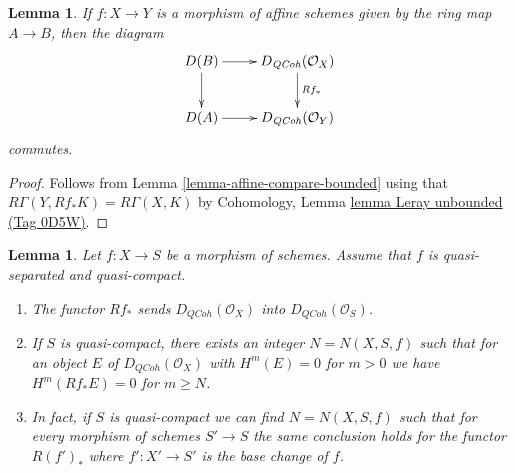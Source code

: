 \documentclass{amsart}
\theoremstyle{plain}
\newtheorem{lemma}[subsection]{Lemma}
\theoremstyle{definition}
\theoremstyle{remark}
\numberwithin{equation}{subsection}
\def\QCoh{\mathit{QCoh}}
\begin{document}
\begin{lemma}
\label{lemma-quasi-coherence-pushforward}
If $f : X \to Y$ is a morphism of affine schemes given by the ring map
$A \to B$, then the diagram
$$
\xymatrix{
D(B) \ar[d] \ar[r] & D_\QCoh(\mathcal{O}_X) \ar[d]^{Rf_*} \\
D(A) \ar[r] & D_\QCoh(\mathcal{O}_Y)
}
$$
commutes.
\end{lemma}

\begin{proof}
Follows from Lemma \ref{lemma-affine-compare-bounded}
using that $R\Gamma(Y, Rf_*K) = R\Gamma(X, K)$ by
Cohomology, Lemma \href{https://stacks.math.columbia.edu/tag/0D5W}{lemma Leray unbounded (Tag 0D5W)}.
\end{proof}


\begin{lemma}
\label{lemma-quasi-coherence-direct-image}
Let $f : X \to S$ be a morphism of schemes.
Assume that $f$ is quasi-separated and quasi-compact.
\begin{enumerate}
\item The functor $Rf_*$ sends $D_\QCoh(\mathcal{O}_X)$
into $D_\QCoh(\mathcal{O}_S)$.
\item If $S$ is quasi-compact, there exists an integer $N = N(X, S, f)$
such that for an object $E$ of $D_\QCoh(\mathcal{O}_X)$
with $H^m(E) = 0$ for $m > 0$ we have
$H^m(Rf_*E) = 0$ for $m \geq N$.
\item In fact, if $S$ is quasi-compact we can find $N = N(X, S, f)$
such that for every morphism of schemes $S' \to S$
the same conclusion holds for the functor $R(f')_*$
where $f' : X' \to S'$ is the base change of $f$.
\end{enumerate}
\end{lemma}
\end{document}
